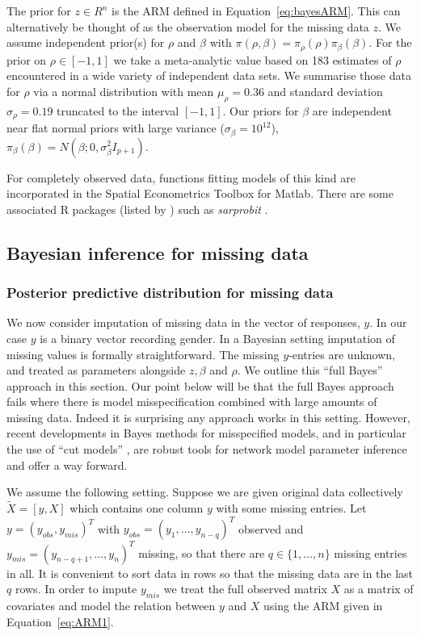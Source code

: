 \documentclass{article}
\begin{document}
%
The prior for $z\in R^n$ is the ARM defined in Equation~\ref{eq:bayesARM}. This can alternatively be thought of as the observation model for the missing data $z$.
We assume independent prior(s) for $\rho$ and $\beta$ with $\pi(\rho, \beta)=\pi_\rho(\rho)\pi_\beta(\beta)$.
For the prior on $\rho\in [-1, 1]$ we take a meta-analytic value based on 183 estimates of $\rho$ \cite{dittrich2017bayesian} encountered in a wide variety of independent
data sets. We summarise those data for $\rho$ via a normal distribution with mean $\mu_\rho=0.36$ and standard deviation $\sigma_\rho=0.19$ truncated
to the interval $[-1,1]$.
 Our priors for $\beta$ are independent near flat normal priors with large variance ($\sigma_\beta=10^{12}$), $\pi_\beta(\beta)=N(\beta; 0, \sigma_\beta^2I_{p+1})$.

For completely observed data, functions fitting models of this kind are incorporated in the Spatial Econometrics Toolbox for Matlab. There are some associated R packages (listed by \cite{martinetti2016probitspatial}) such as \textit{sarprobit} \cite{wilhelm2013estimating}.

\subsection{Bayesian inference for missing data}

\subsubsection{Posterior predictive distribution for missing data}
We now consider imputation of missing data in the vector of responses, $y$. In our case $y$ is a binary vector recording gender. In a Bayesian setting imputation of missing values is formally straightforward. The missing $y$-entries are unknown, and treated as parameters alongside $z, \beta$ and $\rho$. We outline this ``full Bayes'' approach in this section.
Our point below will be that the full Bayes approach fails where there is model misspecification
combined with large amounts of missing data. Indeed it is surprising any approach works in this setting.
However, recent developments in Bayes methods for misspecified models, and in particular the use of ``cut models'' \cite{plummer2015cuts}, are robust tools for network model parameter inference and offer a way forward.

We assume the following setting. Suppose we are given original data collectively $\tilde X=[y,X]$ which
contains one column $y$ with some missing entries. Let $y=(y_{obs}, y_{mis})^T$ with $y_{obs}=(y_1,...,y_{n-q})^T$
observed and $y_{mis}=(y_{n-q+1},...,y_{n})^T$ missing, so that there are $q\in \{1,...,n\}$ missing entries in all.
It is convenient to sort data in rows so that the missing data are in the last $q$ rows.
In order to impute $y_{mis}$ we treat the full observed matrix $X$ as a matrix of covariates and model the relation between
$y$ and $X$ using the ARM given in Equation~\ref{eq:ARM1}.
\end{document}
